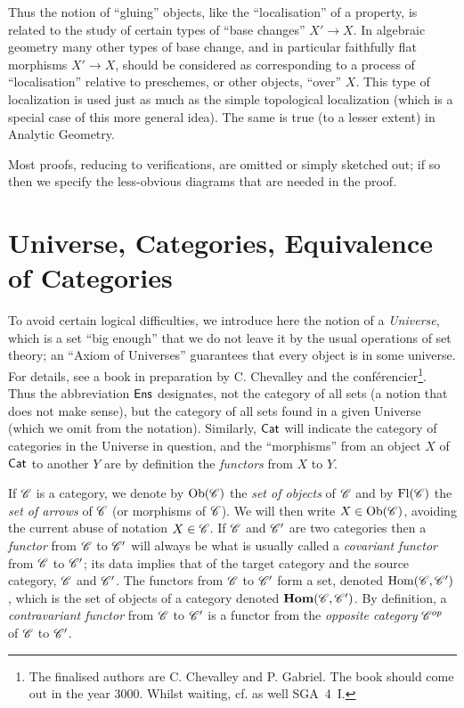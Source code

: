 \documentclass[../main.tex]{subfiles}
\begin{document}
Thus the notion of ``gluing'' objects, like the ``localisation'' of a property, is related to the study of certain types of ``base changes'' $X '\to X$. 
In algebraic geometry many other types of base change, and in particular faithfully flat morphisms $X '\to X$, should be considered as corresponding to a process of ``localisation'' relative to preschemes, or other objects, ``over'' $X$.
This type of localization is used just as much as the simple topological localization (which is a special case of this more general idea). 
The same is true (to a lesser extent) in Analytic Geometry. 

Most proofs, reducing to verifications, are omitted or simply sketched out; if so then we specify the less-obvious diagrams that are needed in the proof.


\section{Universe, Categories, Equivalence of Categories}

To avoid certain logical difficulties, we introduce here the notion of a \emph{Universe}, which is a set ``big enough'' that we do not leave it by the usual operations of set theory; an ``Axiom of Universes'' guarantees that every object is in some universe. 
For details, see a book in preparation by C. Chevalley and the conférencier\footnote{The finalised authors are C. Chevalley and P. Gabriel. The book should come out in the year 3000. Whilst waiting, cf. as well SGA~4~I.}. 
Thus the abbreviation $\mathsf{Ens}$ designates, not the category of all sets (a notion that does not make sense), but the category of all sets found in a given Universe (which we omit from the notation). 
Similarly, $\mathsf{Cat}$ will indicate the category of categories in the Universe in question, and the ``morphisms'' from an object $X$ of $\mathsf{Cat}$ to another $Y$ are by definition the \emph{functors} from $X$ to $Y$.

If $\mathscr{C}$ is a category, we denote by $\mathrm{Ob} (\mathscr{C})$ the \emph{set of objects} of $\mathscr{C}$ and by $\mathrm{Fl} (\mathscr{C})$ the \emph{set of arrows} of $\mathscr{C}$ (or morphisms of $\mathscr{C}$). 
We will then write $X \in \mathrm{Ob} (\mathscr{C})$, avoiding the current abuse of notation $X \in \mathscr{C}$. 
If $\mathscr{C}$ and $\mathscr{C}'$ are two categories then a \emph{functor} from $\mathscr{C}$ to $\mathscr{C}'$ will always be what is usually called a \emph{covariant functor} from $\mathscr{C}$ to $\mathscr{C}'$; its data implies that of the target category and the source category, $\mathscr{C}$ and $\mathscr{C}'$. The functors from $\mathscr{C}$ to $\mathscr{C}'$ form a set, denoted $\mathrm{Hom} (\mathscr{C}, \mathscr{C}')$, which is the set of objects of a category denoted $\textbf{Hom} (\mathscr{C}, \mathscr{C}')$.
By definition, a \emph{contravariant functor} from $\mathscr{C}$ to $\mathscr{C}'$ is a functor from the \emph{opposite category} $\mathscr{C}^{op}$ of $\mathscr{C}$ to $\mathscr{C}'$.
\end{document}
